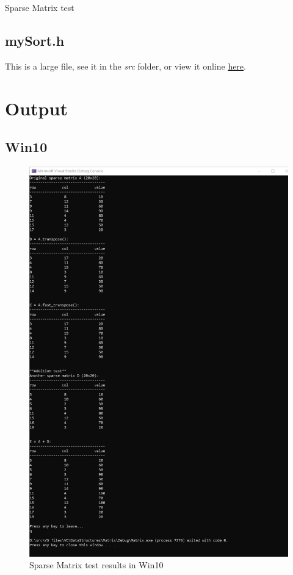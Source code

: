 \documentclass{article}
\begin{document}
	\begin{longlisting}
		\inputminted{c++}{src/SMatrix_test.cpp}
		\caption{Sparse Matrix test}
		\label{SMatrix_test.cpp}
	\end{longlisting}

	\subsection{mySort.h}
	This is a large file, see it in the \emph{src} folder,
	or view it online \href{
	https://github.com/How-u-doing/DataStructures/blob/master/Sort/mySort.h}
	{here}.
		
		
	\clearpage
	\section{Output}
	\subsection{Win10}
	\begin{figure}[!hb]
		\centering
		\includegraphics[width=0.75\linewidth]{img/sparse_matrix_tests_win10}
		\caption{Sparse Matrix test results in Win10}
		\label{fig:sparsematrixtestswin10}
	\end{figure}
	
\end{document}
